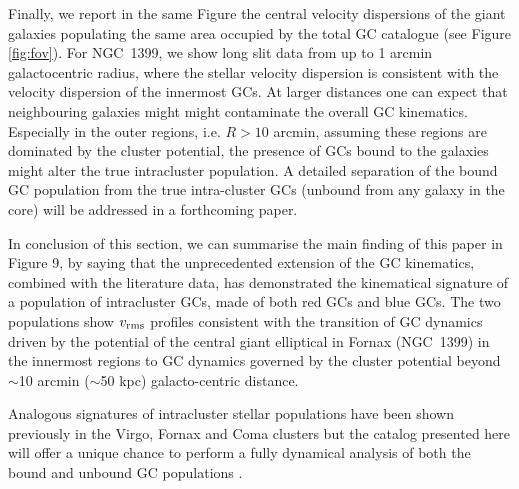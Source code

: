 \documentclass[usenatbib]{mnras}
\begin{document}
Finally, we report in the same Figure the central velocity dispersions of 
the giant galaxies populating the same area occupied by the total GC catalogue (see Figure \ref{fig:fov}). 
For NGC~1399, we show long slit data from \citet{Saglia00} up 
to 1 arcmin galactocentric radius, where the stellar velocity dispersion is consistent with
the velocity dispersion of the innermost GCs.
At larger distances one can expect that neighbouring galaxies might
might contaminate the overall GC kinematics. Especially in the outer regions, 
i.e. $R>10$ arcmin, assuming these regions are dominated by the cluster 
potential, the presence of GCs bound to the galaxies might alter the true  
intracluster population. A detailed separation of the bound GC population from 
the true intra-cluster GCs (unbound from any galaxy in the core) will be addressed in a 
forthcoming paper. 

In conclusion of this section, we can summarise the main finding of this paper 
in Figure 9, by saying that the unprecedented extension of the GC kinematics, 
combined with the literature data, has demonstrated the kinematical signature 
of a population of intracluster GCs, made of both red GCs and blue GCs. 
The two populations show $v_{\rm rms}$ profiles consistent with the transition of GC 
dynamics driven by the potential of the central giant elliptical in Fornax (NGC~1399) 
in the innermost regions to GC dynamics governed by the cluster potential 
beyond $\sim$10 arcmin ($\sim$50 kpc) galacto-centric distance.

Analogous signatures of intracluster stellar populations have been shown 
previously in the Virgo, Fornax and Coma clusters \citep[see e.g., ][]{Paolillo02, Arnaboldi04, Peng11,
Longobardi15} but the catalog presented here will offer a unique 
chance to perform a fully dynamical analysis of both the bound and unbound GC 
populations \citep{DAbrusco16}.
\end{document}
